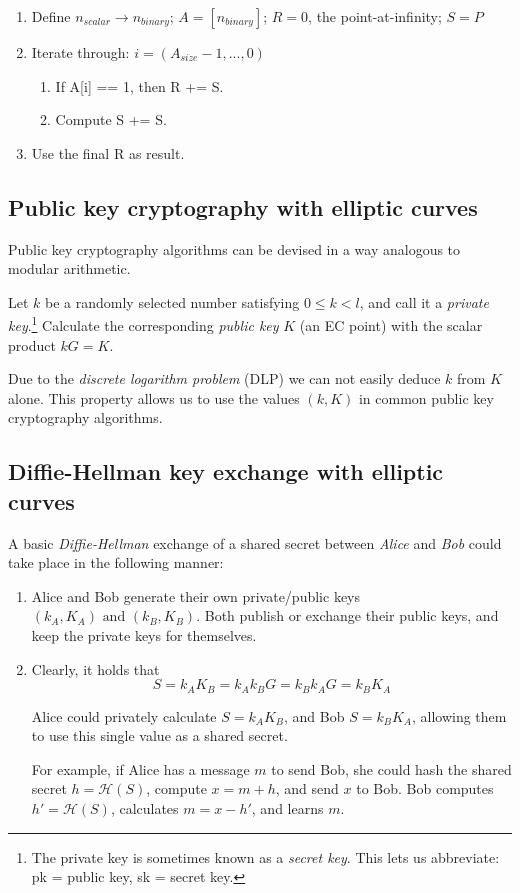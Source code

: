 \begin{enumerate}
	\item Define $n_{scalar} \rightarrow n_{binary}$; $A = [n_{binary}]$; $R = 0$, the point-at-infinity; $S = P$
	\item Iterate through: $i = (A_{size} - 1,...,0)$
	\begin{enumerate}
		\item If A[i] == 1, then R += S.
		\item Compute S += S.
	\end{enumerate}
	\item Use the final R as result.
\end{enumerate}


\subsection{Public key cryptography with elliptic curves}
\label{ec:keys}
Public key cryptography algorithms can be devised in a way analogous to modular arithmetic.

Let \(k\) be a randomly selected number satisfying \(0 \leq k < l\), and call it a {\em private key}.\footnote{The private key is sometimes known as a {\em secret key}. This lets us abbreviate: pk = public key, sk = secret key.} Calculate the corresponding {\em public key} \(K\) (an EC point) with the scalar product \(k G = K\). 

Due to the {\em discrete logarithm problem} (DLP) we can not easily deduce \(k\) from \(K\) alone. This property allows us to use the values \( (k, K) \) in common public key cryptography algorithms.


\subsection{Diffie-Hellman key exchange with elliptic curves}
\label{DH_exchange_section}

A basic {\em Diffie-Hellman} \cite{Diffie-Hellman} exchange of a shared secret between {\em Alice} and {\em Bob} could take place in the following manner:

\begin{enumerate}
	
	\item Alice and Bob generate their own private/public keys \((k_A, K_A) \textrm{ and } (k_B, K_B)\). Both publish or exchange their public keys, and keep the private keys for themselves.
	
	\item Clearly, it holds that \[S = k_A K_B = k_A k_B G = k_B k_A G = k_B K_A\]
	
	Alice could privately calculate \(S = k_A K_B\), and Bob \(S = k_B K_A\), allowing them to use this single value as a shared secret.
	
	For example, if Alice has a message $m$ to send Bob, she could hash the shared secret \(h = \mathcal{H}(S)\), compute $x = m + h$, and send $x$ to Bob. Bob computes $h' = \mathcal{H}(S)$, calculates $m = x - h'$, and learns $m$.
	
\end{enumerate}   


